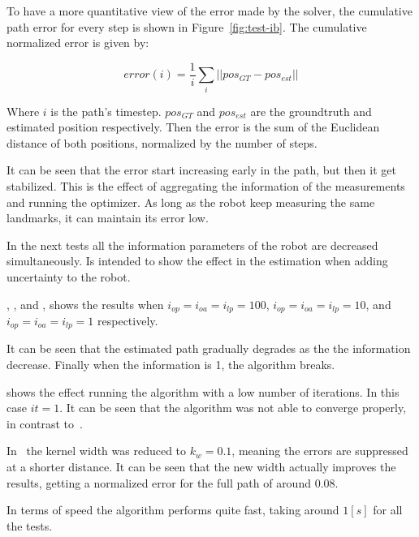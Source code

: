 To have a more quantitative view of the error made by the solver, the cumulative path error for every step is shown in Figure~\ref{fig:test-ib}.  The cumulative normalized error is given by:

\begin{equation}
error (i) = \frac{1}{i} \sum_{i} ||pos_{GT}-pos_{est}||
\end{equation} 

Where $i$ is the path's timestep. $pos_{GT}$ and $pos_{est}$ are the groundtruth and estimated position respectively. Then the error is the sum of the Euclidean distance of both positions, normalized by the number of steps. 

It can be seen that the error start increasing early in the path, but then it get stabilized. This is the effect of aggregating the information of the measurements and running the optimizer. As long as the robot keep measuring the same landmarks, it can maintain its error low. 

In the next tests all the information parameters of the robot are decreased simultaneously. Is intended to show the effect in the estimation when adding uncertainty to the robot.

, , and , shows the results when $i_{op}=i_{oa}=i_{lp}=100$, $i_{op}=i_{oa}=i_{lp}=10$, and $i_{op}=i_{oa}=i_{lp}=1$ respectively.


It can be seen that the estimated path gradually degrades as the the information decrease. Finally when the information is 1, the algorithm breaks.

 shows the effect running the algorithm with a low number of iterations. In this case $it=1$. It can be seen that the algorithm was not able to converge properly, in contrast to~.

In~ the kernel width was reduced to $k_w=0.1$, meaning the errors are suppressed at a shorter distance. It can be seen that the new width actually improves the results, getting a normalized error for the full path of around 0.08.

In terms of speed the algorithm performs quite fast, taking around $1[s]$ for all the tests.


